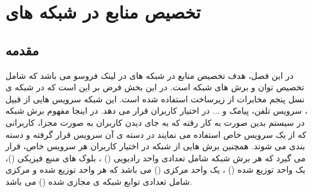 \chapter{تخصیص منابع در شبکه های }
\section{مقدمه}
در این فصل، هدف تخصیص منابع در شبکه های  در لینک فروسو می باشد که شامل تخصیص توان و برش های شبکه است.
در این بخش فرض بر این است که در شبکه ی نسل پنجم مخابرات از زیرساخت  استفاده شده است. این شبکه سرویس هایی از قبیل ، سرویس تلفن، پیامک و ... در اختیار کاربران قرار می دهد. در اینجا  مفهوم برش شبکه در سیستم بدین صورت به کار رفته که به جای دیدن کاربران به صورت مجزا، کاربرانی که از یک سرویس خاص استفاده می نمایند در دسته ی آن سرویس قرار گرفته و دسته بندی می شوند. همچنین برش هایی از شبکه در اختیار کاربران هر سرویس خاص، قرار می گیرد که هر برش شبکه شامل تعدادی واحد رادیویی
() 
،
بلوک های منبع فیزیکی
 ()، 
 یک واحد توزیع شده
() 
 ، 
 یک واحد مرکزی
()  
  می باشد که هر واحد توزیع شده و مرکزی شامل تعدادی توابع شبکه ی مجازی شده
() 
می باشد. 

